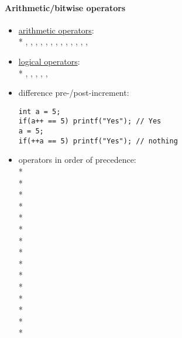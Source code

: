 \paragraph{Arithmetic/bitwise operators}
\begin{itemize}
  \item \underline{arithmetic operators}: \\*
    , , , , , , , , , , , , , 
  \item \underline{logical operators}: \\*
    , , , , , 
  \item difference pre-/post-increment:
  \begin{lstlisting}[style=customc]
int a = 5;
if(a++ == 5) printf("Yes"); // Yes
a = 5;
if(++a == 5) printf("Yes"); // nothing
  \end{lstlisting}
  \item operators in order of precedence: \\*
     \\*
     \\*
    \code{*, /, \%} \\*
    \code{+, -} \\*
    \code{<<, >>} \\*
    \code{<, <=, >, >=} \\*
    \code{==, !=} \\*
    \code{&} \\*
    \code{^} \\*
    \code{\|} \\*
    \code{&&} \\*
    \code{\|\|} \\*
     \\*
    \code{=, +=, -=, *=, /=, \%=, &=, ~=, |=, <<=, >>=} \\*
    \code{,}
\end{itemize}

